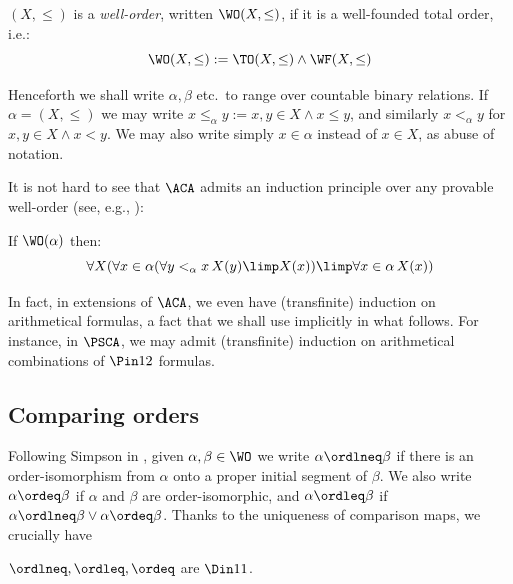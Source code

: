 
$(X,\leq)$ is a \emph{well-order}, written $\WO(X,\leq)$, if it is a well-founded total order, i.e.:
\[
\WO(X,\leq) := \TO(X,\leq) \land \WF(X,\leq)
\]

Henceforth we shall write $\alpha,\beta$ etc.\ to range over countable binary relations.
If $\alpha = (X,\leq)$ we may write $x\leq_\alpha y := x,y \in X \land x\leq y$, and similarly $x<_\alpha y$ for $x,y\in X \land x<y$.
We may also write simply $x \in \alpha$ instead of $x \in X$, as abuse of notation.

It is not hard to see that $\ACA$ admits an induction principle over any provable well-order (see, e.g., \cite{Simpson99:monograph}):
\begin{fact}
\label{fact:wo-ind-in-aca}
If $\WO(\alpha)$ then:
\[
\forall X (\forall x\in \alpha (\forall y<_\alpha x\,  X(y) \limp X(x)) \limp \forall x \in \alpha\,  X(x))
\]
\end{fact}
In fact, in extensions of $\ACA$, we even have (transfinite) induction on arithmetical formulas, a fact that we shall use implicitly in what follows.
For instance, in $\PSCA$, we may admit (transfinite) induction on arithmetical combinations of $\Pin 1 2 $ formulas.

\subsection{Comparing orders}
Following Simpson in \cite{Simpson99:monograph},
given $\alpha,\beta \in \WO$ we write $\alpha \ordlneq \beta$ if there is an order-isomorphism from $\alpha$ onto a proper initial segment of $\beta $. We also write $\alpha \ordeq \beta$ if $\alpha $ and $\beta $ are order-isomorphic, and $\alpha \ordleq \beta $ if $\alpha \ordlneq \beta \lor \alpha \ordeq \beta$.
Thanks to the uniqueness of comparison maps, we crucially have

\begin{proposition}
[$\ATR_0$]
    $\ordlneq, \ordleq, \ordeq$ are $\Din 1 1 $.
\end{proposition}
    

